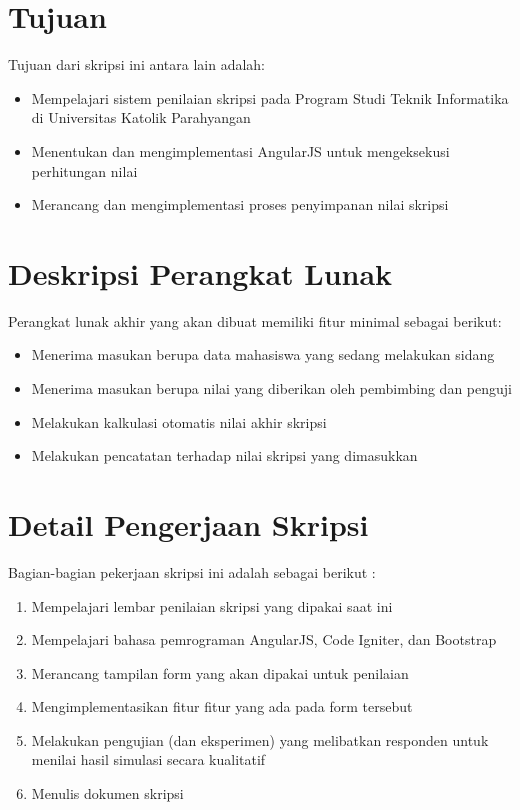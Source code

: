 \documentclass[a4paper,twoside]{article}
\begin{document}
\section{Tujuan}
Tujuan dari skripsi ini antara lain adalah:
\begin{itemize}
	\item Mempelajari sistem penilaian skripsi pada Program Studi Teknik Informatika di Universitas Katolik Parahyangan
	\item Menentukan dan mengimplementasi AngularJS untuk mengeksekusi perhitungan nilai 
	\item Merancang dan mengimplementasi proses penyimpanan nilai skripsi
\end{itemize}

\section{Deskripsi Perangkat Lunak}
Perangkat lunak akhir yang akan dibuat memiliki fitur minimal sebagai berikut:
\begin{itemize}
	\item Menerima masukan berupa data mahasiswa yang sedang melakukan sidang
	\item Menerima masukan berupa nilai yang diberikan oleh pembimbing dan penguji
	\item Melakukan kalkulasi otomatis nilai akhir skripsi
	\item Melakukan pencatatan terhadap nilai skripsi yang dimasukkan
\end{itemize}

\section{Detail Pengerjaan Skripsi}
Bagian-bagian pekerjaan skripsi ini adalah sebagai berikut :
	\begin{enumerate}
		\item Mempelajari lembar penilaian skripsi yang dipakai saat ini
		\item Mempelajari bahasa pemrograman AngularJS, Code Igniter, dan Bootstrap
		\item Merancang tampilan form yang akan dipakai untuk penilaian
		\item Mengimplementasikan fitur fitur yang ada pada form tersebut
		\item Melakukan pengujian (dan eksperimen) yang melibatkan responden untuk menilai hasil simulasi secara kualitatif
		\item Menulis dokumen skripsi
	\end{enumerate}
\end{document}
